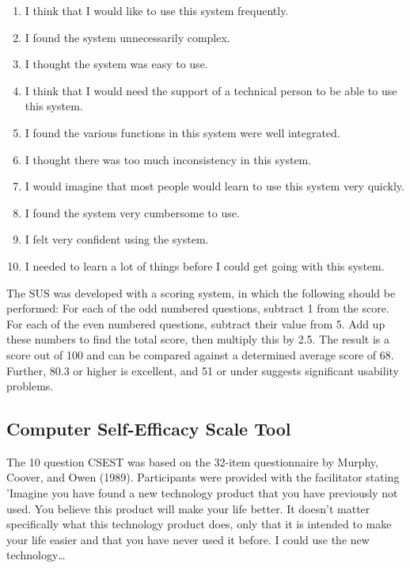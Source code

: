 \documentclass[a4paper, nobind]{templates/ociamthesis}
\providecommand{\tightlist}{%
  \setlength{\itemsep}{0pt}\setlength{\parskip}{0pt}}
\begin{document}
\begin{enumerate}
\def\labelenumi{\arabic{enumi}.}
\tightlist
\item
  I think that I would like to use this system frequently.
\item
  I found the system unnecessarily complex.
\item
  I thought the system was easy to use.
\item
  I think that I would need the support of a technical person to be able to use this system.
\item
  I found the various functions in this system were well integrated.
\item
  I thought there was too much inconsistency in this system.
\item
  I would imagine that most people would learn to use this system very quickly.
\item
  I found the system very cumbersome to use.
\item
  I felt very confident using the system.
\item
  I needed to learn a lot of things before I could get going with this system.
\end{enumerate}

The SUS was developed with a scoring system, in which the following should be performed: For each of the odd numbered questions, subtract 1 from the score.
For each of the even numbered questions, subtract their value from 5.
Add up these numbers to find the total score, then multiply this by 2.5.
The result is a score out of 100 and can be compared against a determined average score of 68.
Further, 80.3 or higher is excellent, and 51 or under suggests significant usability problems.

\hypertarget{computer-self-efficacy-scale-tool}{%
\subsection{Computer Self-Efficacy Scale Tool}\label{computer-self-efficacy-scale-tool}}

The 10 question CSEST was based on the 32-item questionnaire by Murphy, Coover, and Owen (1989).
Participants were provided with the facilitator stating 'Imagine you have found a new technology product that you have previously not used.
You believe this product will make your life better.
It doesn't matter specifically what this technology product does, only that it is intended to make your life easier and that you have never used it before.
I could use the new technology\ldots{}
\end{document}

